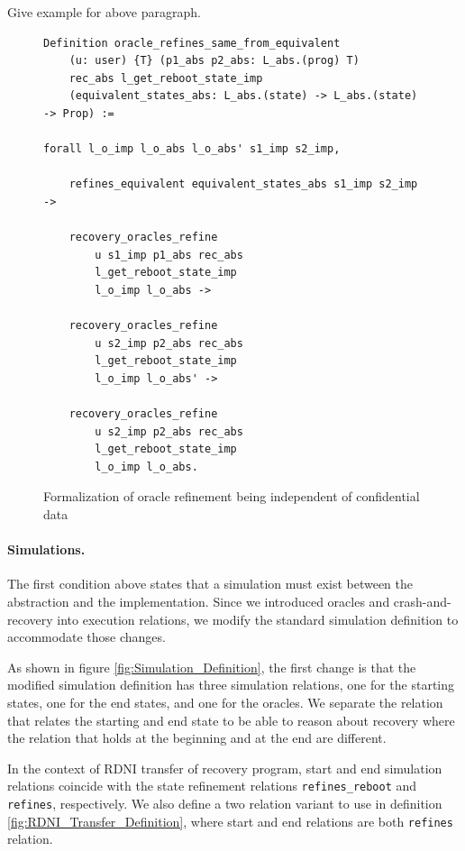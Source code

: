 {\color{red} Give example for above paragraph.}

\begin{figure}[H]
\centering
\begin{verbatim}
Definition oracle_refines_same_from_equivalent
    (u: user) {T} (p1_abs p2_abs: L_abs.(prog) T)
    rec_abs l_get_reboot_state_imp
    (equivalent_states_abs: L_abs.(state) -> L_abs.(state) -> Prop) :=
    
forall l_o_imp l_o_abs l_o_abs' s1_imp s2_imp,

    refines_equivalent equivalent_states_abs s1_imp s2_imp ->

    recovery_oracles_refine 
        u s1_imp p1_abs rec_abs 
        l_get_reboot_state_imp 
        l_o_imp l_o_abs ->

    recovery_oracles_refine 
        u s2_imp p2_abs rec_abs 
        l_get_reboot_state_imp 
        l_o_imp l_o_abs' ->

    recovery_oracles_refine 
        u s2_imp p2_abs rec_abs 
        l_get_reboot_state_imp 
        l_o_imp l_o_abs.
\end{verbatim}
\caption{Formalization of oracle refinement being independent of confidential data}
\label{fig:ORS_Definition}
\end{figure}

\paragraph{Simulations.}
The first condition above states that a simulation must exist between the abstraction and the implementation. Since we introduced oracles and crash-and-recovery into execution relations, we modify the standard simulation definition to accommodate those changes. 

As shown in figure \ref{fig:Simulation_Definition}, the first change is that the modified simulation definition has three simulation relations, one for the starting states, one for the end states, and one for the oracles. We separate the relation that relates the starting and end state to be able to reason about recovery where the relation that holds at the beginning and at the end are different. 

In the context of RDNI transfer of recovery program, start and end simulation relations coincide with the state refinement relations \texttt{refines\_reboot} and \texttt{refines}, respectively. We also define a two relation variant to use in definition  \ref{fig:RDNI_Transfer_Definition}, where start and end relations are both \texttt{refines} relation.

